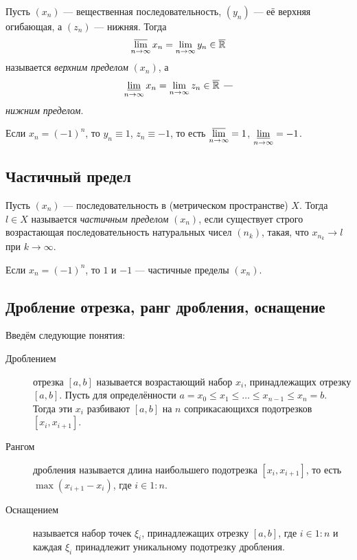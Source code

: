 \begin{ndefinition}
	Пусть \((x_n)\) --- вещественная последовательность, \((y_n)\) --- её верхняя огибающая, а \((z_n)\) --- нижняя. Тогда \[
	\varlimsup_{n \to \infty} x_n = \lim_{n \to \infty} y_n \in \overline{\mathbb{R}}
	\]
	называется \textit{верхним пределом} \((x_n)\), а \[
	\varliminf\limits_{n \to \infty} x_n = \lim\limits_{n \to \infty} z_n \in \overline{\mathbb{R}} \ \textit{---}
	\]
	\textit{нижним пределом}.
\end{ndefinition}

\begin{example}
	Если \(x_n = (-1)^n\), то \(y_n \equiv 1\), \(z_n \equiv -1\), то есть \(\varlimsup\limits_{n \to \infty} = 1\), \(\varliminf\limits_{n \to \infty} = -1\).
\end{example}

\subsection{Частичный предел}

\begin{definition}
	Пусть \((x_n)\) --- последовательность в (метрическом пространстве) \(X\). Тогда \(l \in X\) называется \textit{частичным пределом} \((x_n)\), если существует строго возрастающая последовательность натуральных чисел \((n_k)\), такая, что \(x_{n_k} \to l\) при \(k \to \infty\).
\end{definition}

\begin{example}
	Если \(x_n = (-1)^n\), то \(1\) и \(-1\) --- частичные пределы \((x_n)\).
\end{example}

\subsection{Дробление отрезка, ранг дробления, оснащение}

\begin{definition}
	Введём следующие понятия:
	\begin{description}
		\item[Дроблением] отрезка \([a, b]\) называется возрастающий набор \(x_i\), принадлежащих отрезку \([a, b]\). Пусть для определённости \linebreak \(a = x_0 \leqslant x_1 \leqslant \ldots \leqslant x_{n - 1} \leqslant x_n = b\). Тогда эти \(x_i\) разбивают \([a, b]\) на \(n\) соприкасающихся подотрезков \([x_i, x_{i + 1}]\).
		\item[Рангом] дробления называется длина наибольшего подотрезка \([x_i, x_{i + 1}]\), то есть \(\max (x_{i + 1} - x_i)\), где \(i \in 1 : n\).
		\item[Оснащением] называется набор точек \(\xi_i\), принадлежащих отрезку \([a, b]\), где \(i \in 1 : n\) и каждая \(\xi_i\) принадлежит уникальному подотрезку дробления.
	\end{description}
\end{definition}

